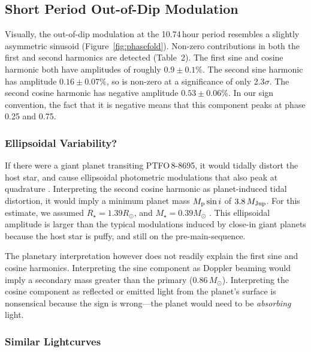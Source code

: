 \documentclass[12pt,twocolumn,tighten]{aastex62}
\newcommand{\ptfo}{PTFO$\,$8-8695}
\begin{document}
\subsection{Short Period Out-of-Dip Modulation}

Visually, the out-of-dip modulation at the 10.74$\,$hour period
resembles a slightly asymmetric sinusoid (Figure~\ref{fig:phasefold}).
Non-zero contributions in both the first and second harmonics are
detected (Table~2).  The first sine and cosine harmonic both have
amplitudes of roughly $0.9\pm0.1\%$.  The second sine harmonic has
amplitude $0.16 \pm 0.07\%$, so is non-zero at a significance of only
2.3$\sigma$.  The second cosine harmonic has negative amplitude $0.53
\pm 0.06\%$.  In our sign convention, the fact that it is negative
means that this component peaks at phase 0.25 and 0.75.

\subsubsection{Ellipsoidal Variability?}
If there were a giant planet transiting \ptfo, it would tidally
distort the host star, and cause ellipsoidal photometric modulations
that also peak at quadrature \citep[see][]{shporer_astrophysics_2017}.
Interpreting the second cosine harmonic as planet-induced tidal distortion,
it would imply a minimum planet mass $M_{\rm p} \sin i$ of
$3.8\,M_{\rm Jup}$.  For this estimate, we assumed $R_\star = 1.39
R_\odot$, and $M_\star = 0.39 M_\odot$ \citep{van_eyken_ptf_2012}.
This ellipsoidal amplitude is larger than the typical
modulations induced by close-in giant planets because the host star is
puffy, and still on the pre-main-sequence.

The planetary interpretation however does not readily explain the
first sine and cosine harmonics.  Interpreting the sine component as
Doppler beaming would imply a secondary mass greater than the primary
($0.86\,M_\odot$).  Interpreting the cosine component as reflected or
emitted light from the planet's surface is nonsensical because the sign is wrong---the
planet would need to be {\it absorbing} light.

\subsubsection{Similar Lightcurves}
\label{subsec:dipstars}
\end{document}
